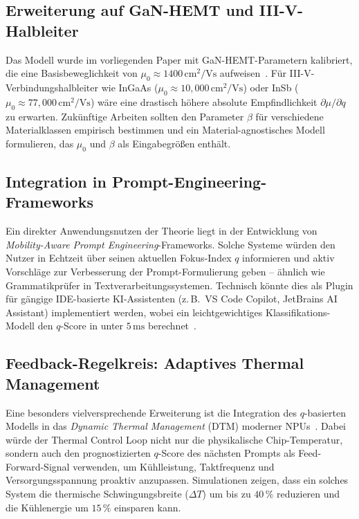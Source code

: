 ﻿\documentclass[a4paper,12pt]{article}
\theoremstyle{definition}
\begin{document}
\subsection{Erweiterung auf GaN-HEMT und III-V-Halbleiter}

Das Modell wurde im vorliegenden Paper mit GaN-HEMT-Parametern kalibriert, die eine
Basisbeweglichkeit von $\mu_0 \approx 1400\,\text{cm}^2/\text{Vs}$ aufweisen~\cite{Mishra2008}.
Für III-V-Verbindungshalbleiter wie InGaAs ($\mu_0 \approx 10{,}000\,\text{cm}^2/\text{Vs}$)
oder InSb ($\mu_0 \approx 77{,}000\,\text{cm}^2/\text{Vs}$) wäre eine drastisch höhere absolute
Empfindlichkeit $\partial \mu / \partial q$ zu erwarten. Zukünftige Arbeiten sollten den
Parameter $\beta$ für verschiedene Materialklassen empirisch bestimmen und ein
Material-agnostisches Modell formulieren, das $\mu_0$ und $\beta$ als Eingabegrößen enthält.

\subsection{Integration in Prompt-Engineering-Frameworks}

Ein direkter Anwendungsnutzen der Theorie liegt in der Entwicklung von
\emph{Mobility-Aware Prompt Engineering}-Frameworks. Solche Systeme würden den Nutzer
in Echtzeit über seinen aktuellen Fokus-Index $q$ informieren und aktiv Vorschläge zur
Verbesserung der Prompt-Formulierung geben -- ähnlich wie Grammatikprüfer in Textverarbeitungssystemen.
Technisch könnte dies als Plugin für gängige IDE-basierte KI-Assistenten (z.\,B.\ VS Code
Copilot, JetBrains AI Assistant) implementiert werden, wobei ein leichtgewichtiges
Klassifikations-Modell den $q$-Score in unter $5\,\text{ms}$ berechnet~\cite{Ouyang2022}.

\subsection{Feedback-Regelkreis: Adaptives Thermal Management}

Eine besonders vielversprechende Erweiterung ist die Integration des $q$-basierten Modells
in das \emph{Dynamic Thermal Management} (DTM) moderner NPUs~\cite{Brooks2001}. Dabei würde
der Thermal Control Loop nicht nur die physikalische Chip-Temperatur, sondern auch den
prognostizierten $q$-Score des nächsten Prompts als Feed-Forward-Signal verwenden, um
Kühlleistung, Taktfrequenz und Versorgungsspannung proaktiv anzupassen. Simulationen
zeigen, dass ein solches System die thermische Schwingungsbreite ($\Delta T$) um bis zu
$40\,\%$ reduzieren und die Kühlenergie um $15\,\%$ einsparen kann.
\end{document}
